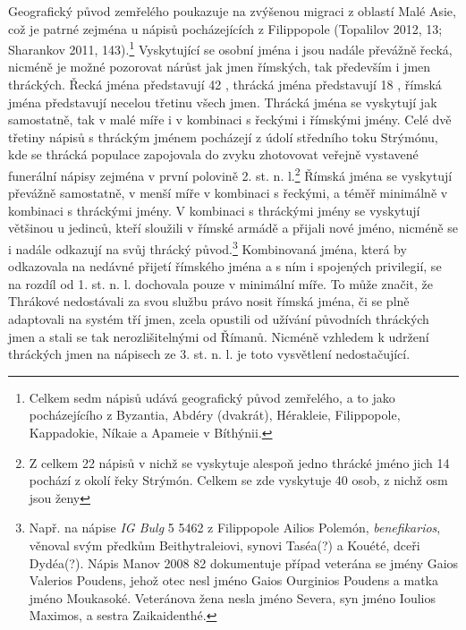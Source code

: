 Geografický původ zemřelého poukazuje na zvýšenou migraci z oblastí Malé Asie, což je patrné zejména u nápisů pocházejících z Filippopole (Topalilov 2012, 13; Sharankov 2011, 143).\footnote{Celkem sedm nápisů udává geografický původ zemřelého, a to jako pocházejícího z Byzantia, Abdéry (dvakrát), Hérakleie, Filippopole, Kappadokie, Níkaie a Apameie v Bíthýnii.} Vyskytující se osobní jména i jsou nadále převážně řecká, nicméně je možné pozorovat nárůst jak jmen římských, tak především i jmen thráckých. Řecká jména představují 42 , thrácká jména představují 18 , římská jména představují necelou třetinu všech jmen. Thrácká jména se vyskytují jak samostatně, tak v malé míře i v kombinaci s řeckými i římskými jmény. Celé dvě třetiny nápisů s thráckým jménem pocházejí z údolí středního toku Strýmónu, kde se thrácká populace zapojovala do zvyku zhotovovat veřejně vystavené funerální nápisy zejména v první polovině 2. st. n. l.\footnote{Z celkem 22 nápisů v nichž se vyskytuje alespoň jedno thrácké jméno jich 14 pochází z okolí řeky Strýmón. Celkem se zde vyskytuje 40 osob, z nichž osm jsou ženy} Římská jména se vyskytují převážně samostatně, v menší míře v kombinaci s řeckými, a téměř minimálně v kombinaci s thráckými jmény. V kombinaci s thráckými jmény se vyskytují většinou u jedinců, kteří sloužili v římské armádě a přijali nové jméno, nicméně se i nadále odkazují na svůj thrácký původ.\footnote{Např. na nápise {\em IG Bulg} 5 5462 z Filippopole Ailios Polemón, {\em benefikarios}, věnoval svým předkům Beithytraleiovi, synovi Taséa(?) a Kouété, dceři Dydéa(?). Nápis Manov 2008 82 dokumentuje případ veterána se jmény Gaios Valerios Poudens, jehož otec nesl jméno Gaios Ourginios Poudens a matka jméno Moukasoké. Veteránova žena nesla jméno Severa, syn jméno Ioulios Maximos, a sestra Zaikaidenthé.} Kombinovaná jména, která by odkazovala na nedávné přijetí římského jména a s ním i spojených privilegií, se na rozdíl od 1. st. n. l. dochovala pouze v minimální míře. To může značit, že Thrákové nedostávali za svou službu právo nosit římská jména, či se plně adaptovali na systém tří jmen, zcela opustili od užívání původních thráckých jmen a stali se tak nerozlišitelnými od Římanů. Nicméně vzhledem k udržení thráckých jmen na nápisech ze 3. st. n. l. je toto vysvětlení nedostačující.

